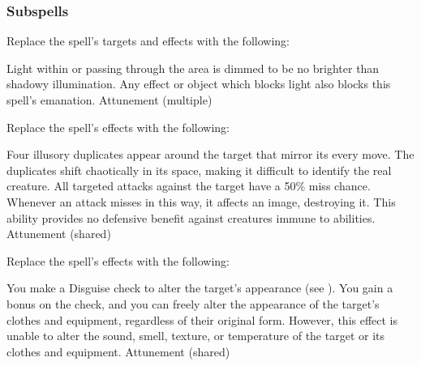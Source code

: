 \subsubsection{Subspells}
Replace the spell's targets and effects with the following:
\begin{spellcontent}
\begin{augmenttargetinginfo}
\end{augmenttargetinginfo}
\begin{augmenteffects}
\spelleffect
Light within or passing through the area is dimmed to be no brighter than shadowy illumination.
Any effect or object which blocks light also blocks this spell's emanation.
\spelldur Attunement (multiple)
\end{augmenteffects}
\end{spellcontent}
Replace the spell's effects with the following:
\begin{spellcontent}
\begin{augmenteffects}
\spelleffect
Four illusory duplicates appear around the target that mirror its every move.
The duplicates shift chaotically in its space, making it difficult to identify the real creature.
All targeted attacks against the target have a 50\% miss chance.
Whenever an attack misses in this way, it affects an image, destroying it.
This ability provides no defensive benefit against creatures immune to  abilities.
\spelldur Attunement (shared)
\end{augmenteffects}
\end{spellcontent}
Replace the spell's effects with the following:
\begin{spellcontent}
\begin{augmenteffects}
\spelleffect
You make a Disguise check to alter the target's appearance (see ).
You gain a  bonus on the check, and you can freely alter the appearance of the target's clothes and equipment, regardless of their original form.
However, this effect is unable to alter the sound, smell, texture, or temperature of the target or its clothes and equipment.
\spelldur Attunement (shared)
\end{augmenteffects}
\end{spellcontent}
